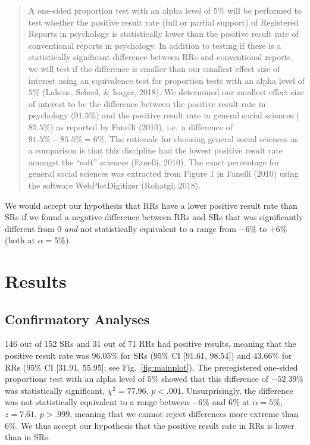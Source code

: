 \documentclass[british,,man,floatsintext]{apa6}
\begin{document}
\begin{quote}
A one-sided proportion test with an alpha level of \(5\%\) will be performed to test whether the positive result rate (full or partial support) of Registered Reports in psychology is statistically lower than the positive result rate of conventional reports in psychology.
In addition to testing if there is a statistically significant difference between RRs and conventional reports, we will test if the difference is smaller than our smallest effect size of interest using an equivalence test for proportion tests with an alpha level of \(5\%\) (Lakens, Scheel, \& Isager, 2018).
We determined our smallest effect size of interest to be the difference between the positive result rate in psychology (\(91.5\%\)) and the positive result rate in general social sciences (\(85.5\%\)) as reported by Fanelli (2010), i.e.~a difference of \(91.5\% - 85.5\% = 6\%\).
The rationale for choosing general social sciences as a comparison is that this discipline had the lowest positive result rate amongst the \enquote{soft} sciences (Fanelli, 2010).
The exact percentage for general social sciences was extracted from Figure 1 in Fanelli (2010) using the software WebPlotDigitizer (Rohatgi, 2018).
\end{quote}

We would accept our hypothesis that RRs have a lower positive result rate than SRs if we found a negative difference between RRs and SRs that was significantly different from 0 \emph{and} not statistically equivalent to a range from \(-6\%\) to \(+6\%\) (both at \(\alpha = 5\%\)).

\hypertarget{results}{%
\section{Results}\label{results}}

\hypertarget{confirmatory-analyses}{%
\subsection{Confirmatory Analyses}\label{confirmatory-analyses}}

146 out of 152 SRs and 31 out of 71 RRs had positive results, meaning that the positive result rate was \(96.05 \%\) for SRs (\(95 \%\) CI {[}91.61, 98.54{]}) and \(43.66 \%\) for RRs (\(95 \%\) CI {[}31.91, 55.95{]}; see Fig.~\ref{fig:mainplot}).
The preregistered one-sided proportions test with an alpha level of \(5\%\) showed that this difference of \(-52.39 \%\) was statistically significant, \(\chi^2 = 77.96\), \(p < .001\).
Unsurprisingly, the difference was not statistically equivalent to a range between \(-6 \%\) and \(6 \%\) at \(\alpha = 5\%\), \(z = 7.61\), \(p > .999\), meaning that we cannot reject differences more extreme than \(6\%\).
We thus accept our hypothesis that the positive result rate in RRs is lower than in SRs.
\end{document}

